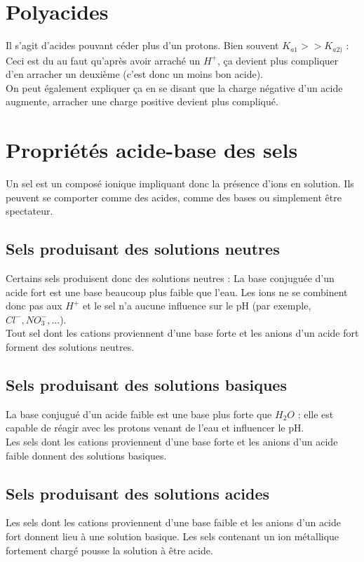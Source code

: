 \documentclass[british,french,11pt, a4paper, openany]{book}
\begin{document}
\section{Polyacides}
Il s'agit d'acides pouvant céder plus d'un protons. Bien souvent $K_{a1} >> K_{a2)}$ : Ceci est du au faut qu'après avoir arraché un $H^+$, ça devient plus compliquer d'en arracher un deuxième (c'est donc un moins bon acide).\\
On peut également expliquer ça en se disant que la charge négative d'un acide augmente, arracher une charge positive devient plus compliqué.

\section{Propriétés acide-base des sels}
Un sel est un composé ionique impliquant donc la présence d'ions en solution. Ils peuvent se comporter comme des acides, comme des bases ou simplement être spectateur. \\

\subsection{Sels produisant des solutions neutres}
Certains sels produisent donc des solutions neutres : La base conjuguée d'un acide fort est une base beaucoup plus faible que l'eau. Les ions ne se combinent donc pas aux $H^+$ et le sel n'a aucune influence sur le pH (par exemple, $Cl^-, NO_3^-, ...$).\\
Tout sel dont les cations proviennent d'une base forte et les anions d'un acide fort forment des solutions neutres.

\subsection{Sels produisant des solutions basiques}
La base conjugué d'un acide faible est une base plus forte que $H_2O$ : elle est capable de réagir avec les protons venant de l'eau et influencer le pH.\\
Les sels dont les cations proviennent d'une base forte et les anions d'un acide faible donnent des solutions basiques.

\subsection{Sels produisant des solutions acides}
Les sels dont les cations proviennent d'une base faible et les anions d'un acide fort donnent lieu à une solution basique. Les sels contenant un ion métallique fortement chargé pousse la solution à être acide. 
\end{document}
